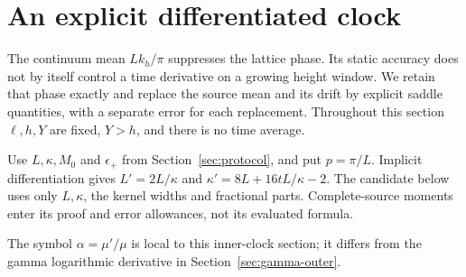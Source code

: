\section{An explicit differentiated clock}\label{sec:explicit}
The continuum mean $Lk_h/\pi$ suppresses the lattice phase. Its static
accuracy does not by itself control a time derivative on a growing
height window. We retain that phase exactly and replace the source mean
and its drift by explicit saddle quantities, with a separate error for
each replacement. Throughout this section $\ell,h,Y$ are fixed,
$Y>h$, and there is no time average.

Use $L,\kappa,M_0$ and $\epsilon_+$ from Section~\ref{sec:protocol},
and put $p=\pi/L$.
Implicit differentiation gives $L'=2L/\kappa$ and
$\kappa'=8L+16tL/\kappa-2$.
The candidate below uses only $L,\kappa$, the kernel widths and
fractional parts. Complete-source moments enter its proof and error
allowances, not its evaluated formula.

The symbol $\alpha=\mu'/\mu$ is local to this inner-clock section;
it differs from the gamma logarithmic derivative in
Section~\ref{sec:gamma-outer}.

